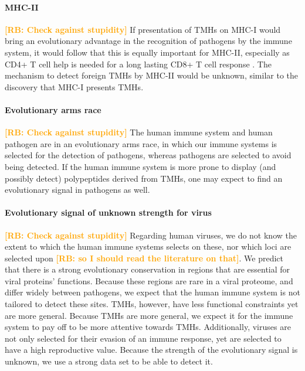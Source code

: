 \documentclass{article}
\newcommand{\richel}[1]{\textcolor{orange}{\textbf{[RB: #1]}}}
\begin{document}
\paragraph{MHC-II}

\richel{Check against stupidity}
If presentation of TMHs on MHC-I would bring an evolutionary advantage 
in the recognition of pathogens by the immune system, 
it would follow that this is equally important for MHC-II, 
especially as CD4+ T cell help is needed for a long lasting CD8+ T cell 
response \cite{novy2007cd4}. 
The mechanism to detect foreign TMHs by MHC-II would be unknown, 
similar to the discovery that MHC-I presents TMHs.

\paragraph{Evolutionary arms race}

\richel{Check against stupidity}
The human immune system and human pathogen are in an evolutionary
arms race, in which our immune systems is selected for the detection
of pathogens, whereas pathogens are selected to avoid being detected.
If the human immune system is more prone to display (and possibly 
detect) polypeptides derived from TMHs, one may expect to find 
an evolutionary signal in pathogens as well. 

\paragraph{Evolutionary signal of unknown strength for virus}

\richel{Check against stupidity}
Regarding human viruses, we do not know the extent to which the human
immune systems selects on these, nor which loci are selected
upon \richel{so I should read the literature on that}. 
We predict that there is a strong 
evolutionary conservation in regions that are essential for viral proteins'
functions. Because these regions are rare in a viral proteome,
and differ widely between pathogens, we expect that the human immune system
is not tailored to detect these sites. TMHs, however, have less 
functional constraints yet are more general. Because TMHs are more general,
we expect it for the immune system to pay off to be more attentive towards
TMHs. 
Additionally, viruses are not only selected for their evasion of an 
immune response, yet are selected to have a high reproductive value.
Because the strength of the evolutionary signal is unknown,
we use a strong data set to be able to detect it.
\end{document}

